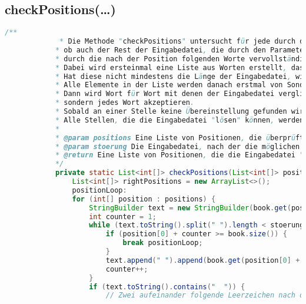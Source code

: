 \documentclass[a4paper, 10pt, ngerman]{scrartcl}
\begin{document}
\clearpage

\subsection{checkPositions(\ldots)}\label{sec:checkPositions()}
\begin{lstlisting}[frame=single, language=Java, title=Methode checkPositions, breaklines=true, label=lst:checkPosition]
			/**
    		 * Die Methode "checkPositions" untersucht für jede durch den Parameter "positions" gegebene Position,
     		* ob auch der Rest der Eingabedatei, die durch den Parameter "stoerung" gegeben ist,
     		* durch die nach der Position folgenden Worte vervollständigt werden kann.
     		* Dabei wird ersteinmal eine Liste aus Worten erstellt, das mit dem durch die Position gegebenen Wort startet.
     		* Hat diese nicht mindestens die Länge der Eingabedatei, wird auch die nächste Zeile hinzugefügt.
     		* Alle Elemente in der Liste werden danach erstmal von Sonderzeichen bereinigt, da diese auch nicht in der Eingabedatei vorgegeben sind.
    		* Dann wird Wort für Wort mit denen der Eingabedatei verglichen, wobei Unterstriche (also Lücken in der Eingabedatei) nicht verglichen werden,
     		* sondern jedes Wort akzeptieren.
     		* Sobald an einer Stelle keine Übereinstellung gefunden wird, wird der Suchvorgang für die eine Position beendet.
     		* Alle Stellen, die die Eingabedatei "lösen" können, werden an eine Liste angefügt, die nach Ende der Methode zurückgegeben wird.
     		*
     		* @param positions Eine Liste von Positionen, die überprüft werden soll
     		* @param stoerung Die Eingabedatei, nach der die möglichen Positionen überprüft werden sollen
     		* @return Eine Liste von Positionen, die die Eingabedatei "lösen" können
     		*/
    		private static List<int[]> checkPositions(List<int[]> positions, List<String> stoerung) {
        		List<int[]> rightPositions = new ArrayList<>();
        		positionLoop:
        		for (int[] position : positions) {
            		StringBuilder text = new StringBuilder(book.get(position[0]).substring(position[1]).toLowerCase());
            		int counter = 1;
            		while (text.toString().split(" ").length < stoerung.size()) {
                		if (position[0] + counter >= book.size()) {
                    		break positionLoop;
                		}
                		text.append(" ").append(book.get(position[0] + counter).toLowerCase());
                		counter++;
           			}
            		if (text.toString().contains("  ")) {
                 		// Zwei aufeinander folgende Leerzeichen nach dem Anfügen eines Leerzeichens an jede Zeile bedeuten, dass hier eine leere Zeile im Buch war.

\end{lstlisting}
\end{document}
